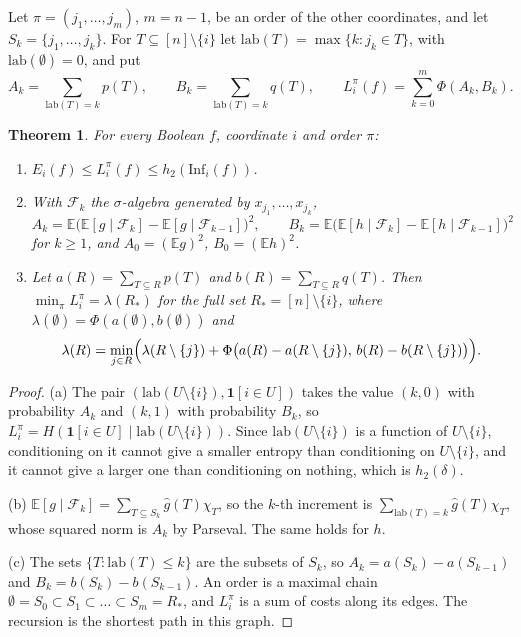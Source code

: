 \documentclass[11pt]{amsart}
\newtheorem{theorem}{Theorem}
\theoremstyle{remark}
\newcommand{\Inf}{\mathrm{Inf}}
\newcommand{\E}{\mathbb{E}}
\newcommand{\lab}{\mathrm{lab}}
\begin{document}
Let $\pi=(j_1,\dots,j_m)$, $m=n-1$, be an order of the other coordinates, and let $S_k=\{j_1,\dots,j_k\}$. For
$T\subseteq[n]\setminus\{i\}$ let $\lab(T)=\max\{k:j_k\in T\}$, with $\lab(\emptyset)=0$, and put
\[
A_k=\sum_{\lab(T)=k}p(T),\qquad B_k=\sum_{\lab(T)=k}q(T),\qquad L^\pi_i(f)=\sum_{k=0}^m\Phi(A_k,B_k).
\]

\begin{theorem}\label{thm:witness}
For every Boolean $f$, coordinate $i$ and order $\pi$:
\begin{enumerate}
\item[(a)] $E_i(f)\le L^\pi_i(f)\le h_2(\Inf_i(f))$.
\item[(b)] With $\mathcal F_k$ the $\sigma$-algebra generated by $x_{j_1},\dots,x_{j_k}$,
\[
A_k=\E\bigl(\E[g\mid\mathcal F_k]-\E[g\mid\mathcal F_{k-1}]\bigr)^2,\qquad
B_k=\E\bigl(\E[h\mid\mathcal F_k]-\E[h\mid\mathcal F_{k-1}]\bigr)^2
\]
for $k\ge1$, and $A_0=(\E g)^2$, $B_0=(\E h)^2$.
\item[(c)] Let $a(R)=\sum_{T\subseteq R}p(T)$ and $b(R)=\sum_{T\subseteq R}q(T)$. Then $\min_\pi L^\pi_i=\lambda(R_*)$ for
the full set $R_*=[n]\setminus\{i\}$, where $\lambda(\emptyset)=\Phi(a(\emptyset),b(\emptyset))$ and
\[
\lambda(R)=\min_{j\in R}\Bigl(\lambda(R\setminus\{j\})+\Phi\bigl(a(R)-a(R\setminus\{j\}),\,b(R)-b(R\setminus\{j\})\bigr)\Bigr).
\]
\end{enumerate}
\end{theorem}

\begin{proof}
(a) The pair $(\lab(U\setminus\{i\}),\mathbf 1[i\in U])$ takes the value $(k,0)$ with probability $A_k$ and $(k,1)$ with
probability $B_k$, so $L^\pi_i=H(\mathbf 1[i\in U]\mid\lab(U\setminus\{i\}))$. Since $\lab(U\setminus\{i\})$ is a
function of $U\setminus\{i\}$, conditioning on it cannot give a smaller entropy than conditioning on
$U\setminus\{i\}$, and it cannot give a larger one than conditioning on nothing, which is $h_2(\delta)$.

(b) $\E[g\mid\mathcal F_k]=\sum_{T\subseteq S_k}\hat g(T)\chi_T$, so the $k$-th increment is
$\sum_{\lab(T)=k}\hat g(T)\chi_T$, whose squared norm is $A_k$ by Parseval. The same holds for $h$.

(c) The sets $\{T:\lab(T)\le k\}$ are the subsets of $S_k$, so $A_k=a(S_k)-a(S_{k-1})$ and $B_k=b(S_k)-b(S_{k-1})$. An
order is a maximal chain $\emptyset=S_0\subset S_1\subset\dots\subset S_m=R_*$, and $L^\pi_i$ is a sum of costs along
its edges. The recursion is the shortest path in this graph.
\end{proof}
\end{document}
